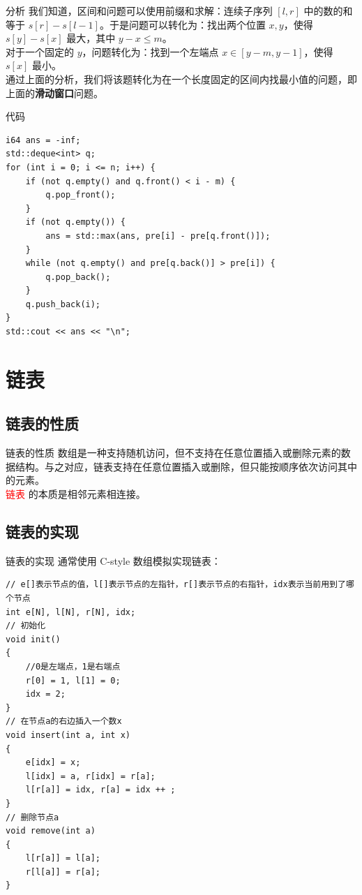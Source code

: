 \documentclass{beamer}
\begin{document}
\begin{frame}{分析}
    我们知道，区间和问题可以使用前缀和求解：连续子序列 $[l, r]$ 中的数的和等于 $s[r] - s[l - 1]$。于是问题可以转化为：找出两个位置 $x, y$，使得 $s[y] - s[x]$ 最大，其中 $y - x \le m$。\\

    对于一个固定的 $y$，问题转化为：找到一个左端点 $x \in [y - m, y - 1]$，使得 $s[x]$ 最小。\\

    通过上面的分析，我们将该题转化为在一个长度固定的区间内找最小值的问题，即上面的\textbf{滑动窗口}问题。
\end{frame}

\begin{frame}[fragile]{代码}
    \begin{verbatim}
i64 ans = -inf;
std::deque<int> q;
for (int i = 0; i <= n; i++) {
    if (not q.empty() and q.front() < i - m) {
        q.pop_front();
    }
    if (not q.empty()) {
        ans = std::max(ans, pre[i] - pre[q.front()]);
    }
    while (not q.empty() and pre[q.back()] > pre[i]) {
        q.pop_back();
    }
    q.push_back(i);
}
std::cout << ans << "\n";
    \end{verbatim}
\end{frame}

\section{链表}
\subsection{链表的性质}
\begin{frame}{链表的性质}
    数组是一种支持随机访问，但不支持在任意位置插入或删除元素的数据结构。与之对应，链表支持在任意位置插入或删除，但只能按顺序依次访问其中的元素。\\

    \textcolor{red}{链表} 的本质是相邻元素相连接。
\end{frame}

\subsection{链表的实现}
\begin{frame}[fragile]{链表的实现}
    通常使用 C-style 数组模拟实现链表：

    \begin{verbatim}
// e[]表示节点的值，l[]表示节点的左指针，r[]表示节点的右指针，idx表示当前用到了哪个节点
int e[N], l[N], r[N], idx;
// 初始化
void init()
{
    //0是左端点，1是右端点
    r[0] = 1, l[1] = 0;
    idx = 2;
}
// 在节点a的右边插入一个数x
void insert(int a, int x)
{
    e[idx] = x;
    l[idx] = a, r[idx] = r[a];
    l[r[a]] = idx, r[a] = idx ++ ;
}
// 删除节点a
void remove(int a)
{
    l[r[a]] = l[a];
    r[l[a]] = r[a];
}
    \end{verbatim}
\end{frame}
\end{document}
